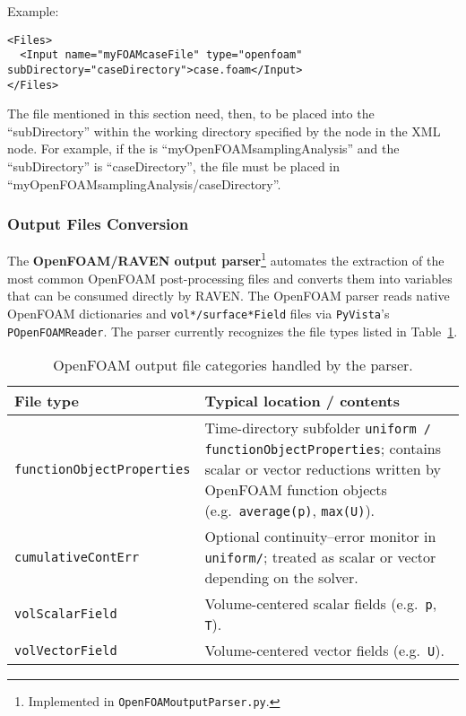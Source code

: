 Example:

\begin{lstlisting}[style=XML]
<Files>
  <Input name="myFOAMcaseFile" type="openfoam" subDirectory="caseDirectory">case.foam</Input>
</Files>
\end{lstlisting}
The file mentioned in this section
need, then, to be placed into the ``subDirectory'' within the working directory specified
by the  node in the  XML node. For example,
if the  is ``myOpenFOAMsamplingAnalysis'' and the ``subDirectory'' is ``caseDirectory'', the file
must be placed in ``myOpenFOAMsamplingAnalysis/caseDirectory''.



\subsubsection{Output Files Conversion}
\label{subsubsec:openfoamInterfaceOutputConversion}

The \textbf{OpenFOAM/RAVEN output parser}\footnote{Implemented in \texttt{OpenFOAMoutputParser.py}.}
automates the extraction of the most common OpenFOAM post-processing files
and converts them into variables that can be consumed directly by RAVEN.
The OpenFOAM parser reads native OpenFOAM dictionaries and \texttt{vol*/surface*Field} files
via \texttt{PyVista}'s \texttt{POpenFOAMReader}.
The parser currently recognizes the file types listed in
Table~\ref{tab:ofAvailableFileTypes}.

\begin{table}[ht]
\centering
\caption{OpenFOAM output file categories handled by the parser.}
\label{tab:ofAvailableFileTypes}
\begin{tabular}{|l|p{9cm}|}
\hline
\textbf{File type} & \textbf{Typical location / contents} \\ \hline
\texttt{functionObjectProperties}          & Time-directory subfolder \texttt{uniform / functionObjectProperties}; contains scalar or vector reductions written by OpenFOAM function objects (e.g.\ \texttt{average(p)}, \texttt{max(U)}). \\ \hline
\texttt{cumulativeContErr} & Optional continuity–error monitor in \texttt{uniform/}; treated as scalar or vector depending on the solver. \\ \hline
\texttt{volScalarField}                    & Volume-centered scalar fields (e.g.\ \texttt{p}, \texttt{T}). \\ \hline
\texttt{volVectorField}                    & Volume-centered vector fields (e.g.\ \texttt{U}). \\ \hline
\end{tabular}
\end{table}

